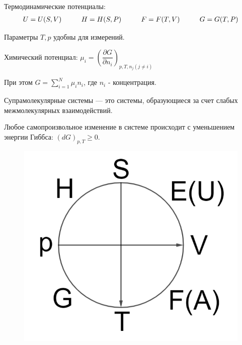 
\begin{lecture}
	
	\begin{lecSection}
	Термодинамические потенциалы:
	\begin{equation}	
	\begin{aligned}
	U = U(S,V) \hspace*{1cm} H = H(S,P) \hspace*{1cm} F = F(T,V) \hspace*{1cm} G = G(T,P)
	\end{aligned}
	\end{equation}
	
	Параметры $T,p$ удобны для измерений.
	
	\begin{definition}
		Химический потенциал: $\mu_i = \left( \dfrac{\partial G}{\partial n_i} \right)_{p, T, n_j (j \neq i)}$
	\end{definition}
	
	При этом $G = \sum\limits_{i=1}^{N} \mu_i n_i$, где $n_i$ - концентрация.
	
	\begin{definition}
		Супрамолекулярные системы --- это системы, образующиеся за счет слабых межмолекулярных взаимодействий.
	\end{definition}
	
	Любое самопроизвольное изменение в системе происходит с уменьшением энергии Гиббса: $(dG)_{p,T}\geq0$.
	\begin{figure}
		\centering\includegraphics[width=\linewidth]{lecture_02/pic1}
	\end{figure}
	\nobreak
	

\end{lecSection}
\end{lecture}
